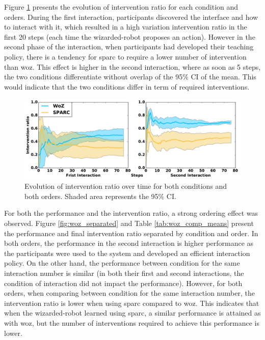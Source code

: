 Figure \ref{fig:woz_ratio_time} presents the evolution of intervention ratio for each condition and orders. During the first interaction, participants discovered the interface and how to interact with it, which resulted in a high variation intervention ratio in the first 20 steps (each time the wizarded-robot proposes an action). However in the second phase of the interaction,  when participants had developed their teaching policy, there is a tendency for \gls{sparc} to require a lower number of intervention than \gls{woz}. This effect is higher in the second interaction, where as soon as 5 steps, the two conditions differentiate without overlap of the 95\% CI of the mean. This would indicate that the two conditions differ in term of required interventions.

\begin{figure}[ht]
	\centering
	\includegraphics[width=1.\textwidth]{ratio_time.pdf}
	\caption{Evolution of intervention ratio over time for both conditions and both orders. Shaded area represents the 95\% CI.}
	\label{fig:woz_ratio_time}
\end{figure}

For both the performance and the intervention ratio, a strong ordering effect was observed. Figure \ref{fig:woz_separated} and Table \ref{tab:woz_comp_means} present the performance and final intervention ratio separated by condition and order. In both orders, the performance in the second interaction is higher performance as the participants were used to the system and developed an efficient interaction policy. On the other hand, the performance between condition for the same interaction number is similar (in both their first and second interactions, the condition of interaction did not impact the performance). However, for both orders, when comparing between condition for the same interaction number, the intervention ratio is lower when using \gls{sparc} compared to \gls{woz}. This indicates that when the wizarded-robot learned using \gls{sparc}, a similar performance is attained as with \gls{woz}, but the number of interventions required to achieve this performance is lower.


